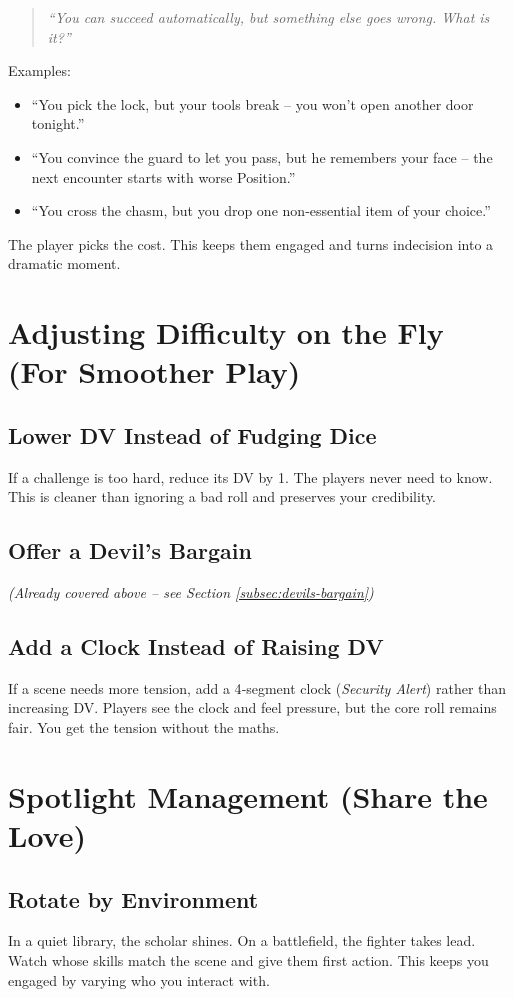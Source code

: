 \begin{quote}
  \emph{“You can succeed automatically, but something else goes wrong. What is it?”}
\end{quote}

Examples:
\begin{itemize}
  \item “You pick the lock, but your tools break – you won’t open another door tonight.”
  \item “You convince the guard to let you pass, but he remembers your face – the next encounter starts with worse Position.”
  \item “You cross the chasm, but you drop one non‑essential item of your choice.”
\end{itemize}
The player picks the cost. This keeps them engaged and turns indecision into a dramatic moment.

\section{Adjusting Difficulty on the Fly (For Smoother Play)}

\subsection*{Lower DV Instead of Fudging Dice}
If a challenge is too hard, reduce its DV by 1. The players never need to know. This is cleaner than ignoring a bad roll and preserves your credibility.

\subsection*{Offer a Devil’s Bargain}
\emph{(Already covered above – see Section \ref{subsec:devils-bargain})}

\subsection*{Add a Clock Instead of Raising DV}
If a scene needs more tension, add a 4‑segment clock (\textit{Security Alert}) rather than increasing DV. Players see the clock and feel pressure, but the core roll remains fair. You get the tension without the maths.

\section{Spotlight Management (Share the Love)}

\subsection*{Rotate by Environment}
In a quiet library, the scholar shines. On a battlefield, the fighter takes lead. Watch whose skills match the scene and give them first action. This keeps you engaged by varying who you interact with.

